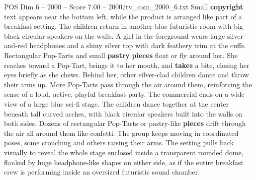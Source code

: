 \begin{textsample}{POS Dim 6 – 2000 – Score 7.00 – 2000/tv\_com\_2000\_6.txt}
Small \textbf{copyright} text appears near the bottom left, while the product is arranged like part of a breakfast setting.
The children return in another blue futuristic room with big black circular speakers on the walls.
A girl in the foreground wears large silver-and-red headphones and a shiny silver top with dark feathery trim at the cuffs.
Rectangular Pop-Tarts and small \textbf{pastry} \textbf{pieces} float or fly around her.
She reaches toward a Pop-Tart, brings it to her mouth, and \textbf{takes} a bite, closing her eyes briefly as she chews.
Behind her, other silver-clad children dance and throw their arms up.
More Pop-Tarts pass through the air around them, reinforcing the sense of a loud, active, playful breakfast party.
The commercial ends on a wide view of a large blue sci-fi stage.
The children dance together at the center beneath tall curved arches, with black circular speakers built into the walls on both sides.
Dozens of rectangular Pop-Tarts or pastry-like \textbf{pieces} drift through the air all around them like confetti.
The group keeps moving in coordinated poses, some crouching and others raising their arms.
The setting pulls back visually to reveal the whole stage enclosed inside a transparent rounded dome, flanked by huge headphone-like shapes on either side, as if the entire breakfast crew is performing inside an oversized futuristic sound chamber.

\end{textsample}
